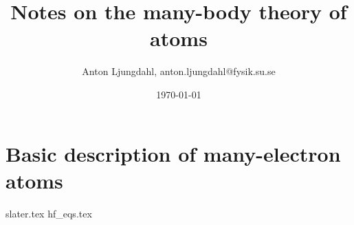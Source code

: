 \documentclass[12pt,a4paper]{article}
\numberwithin{equation}{section}
\begin{document}
\author{Anton Ljungdahl, anton.ljungdahl@fysik.su.se}
\title{Notes on the many-body theory of atoms}
\date{\today}
\maketitle
\tableofcontents

\section{Basic description of many-electron atoms}
{slater.tex}
{hf_eqs.tex}
\end{document}
